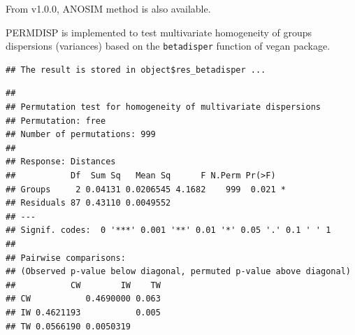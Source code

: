 \documentclass[
]{book}
\newenvironment{Shaded}{\begin{snugshade}}{\end{snugshade}}
\newcommand{\AttributeTok}[1]{\textcolor[rgb]{0.77,0.63,0.00}{#1}}
\newcommand{\CommentTok}[1]{\textcolor[rgb]{0.56,0.35,0.01}{\textit{#1}}}
\newcommand{\ConstantTok}[1]{\textcolor[rgb]{0.00,0.00,0.00}{#1}}
\newcommand{\FunctionTok}[1]{\textcolor[rgb]{0.00,0.00,0.00}{#1}}
\newcommand{\NormalTok}[1]{#1}
\newcommand{\SpecialCharTok}[1]{\textcolor[rgb]{0.00,0.00,0.00}{#1}}
\newcommand{\StringTok}[1]{\textcolor[rgb]{0.31,0.60,0.02}{#1}}
\begin{document}
From v1.0.0, ANOSIM method is also available.

\begin{Shaded}
\end{Shaded}

PERMDISP\citep{Anderson_Navigating_2011} is implemented to test multivariate homogeneity of groups dispersions (variances) based on the \texttt{betadisper} function of vegan package.

\begin{Shaded}
\end{Shaded}

\begin{verbatim}
## The result is stored in object$res_betadisper ...
\end{verbatim}

\begin{Shaded}
\end{Shaded}

\begin{verbatim}
## 
## Permutation test for homogeneity of multivariate dispersions
## Permutation: free
## Number of permutations: 999
## 
## Response: Distances
##           Df  Sum Sq   Mean Sq      F N.Perm Pr(>F)  
## Groups     2 0.04131 0.0206545 4.1682    999  0.021 *
## Residuals 87 0.43110 0.0049552                       
## ---
## Signif. codes:  0 '***' 0.001 '**' 0.01 '*' 0.05 '.' 0.1 ' ' 1
## 
## Pairwise comparisons:
## (Observed p-value below diagonal, permuted p-value above diagonal)
##           CW        IW    TW
## CW           0.4690000 0.063
## IW 0.4621193           0.005
## TW 0.0566190 0.0050319
\end{verbatim}
\end{document}
